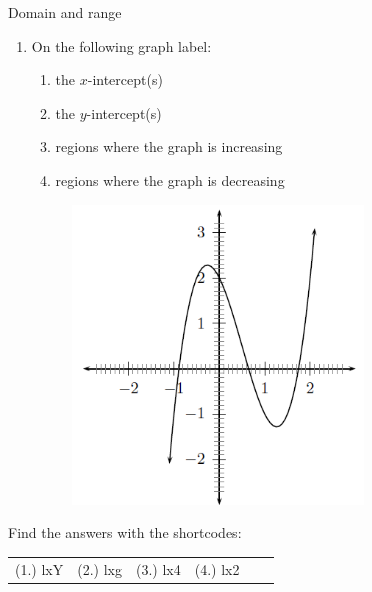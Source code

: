 \begin{exercises}{Domain and range }
{\begin{enumerate}[noitemsep, label=\textbf{\arabic*}. ]
\begin{figure}[H]
\begin{center}
\vspace{2pt}
\vspace{.1in}
\end{center}
\end{figure}               \label{m39337*uid63}\item On the following graph label:
\label{m39337*id237327}\begin{enumerate}[noitemsep, label=\textbf{\alph*}. ] 
\label{m39337*uid64}\item the $x$-intercept(s)
\label{m39337*uid65}\item the $y$-intercept(s)
\label{m39337*uid66}\item regions where the graph is increasing
\label{m39337*uid67}\item regions where the graph is decreasing
\end{enumerate}
\setcounter{subfigure}{0}
\begin{figure}[H] %
\begin{center}
\label{m39337*id237401!!!underscore!!!media}\label{m39337*id237401!!!underscore!!!printimage}\includegraphics[height=300px]{col11306.imgs/m39337_MG10C11_004.png} %
\vspace{2pt}
\vspace{.1in}
\end{center}
\end{figure}               \end{enumerate}
\label{m39337**end}
\par {} Find the answers with the shortcodes:
\par \begin{tabular}[h]{cccccc}
(1.) lxY  &  (2.) lxg  &  (3.) lx4  &  (4.) lx2  & \end{tabular}
}
\end{exercises}
